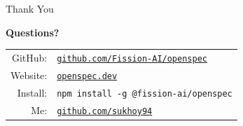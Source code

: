 \documentclass[aspectratio=169,18pt]{beamer}
\begin{document}
\begin{frame}{Thank You}
  \vspace{0.5em}
  \begin{center}
    \Large\textbf{Questions?}\\[1.5em]
    \normalsize
    \begin{tabular}{rl}
      GitHub: & \texttt{\href{https://github.com/Fission-AI/openspec}{\color{openblue}github.com/Fission-AI/openspec}} \\[0.5em]
      Website: & \texttt{\href{https://openspec.dev}{\color{openblue}openspec.dev}} \\[0.5em]
      Install: & \texttt{npm install -g @fission-ai/openspec} \\[0.5em]
      Me: & \texttt{\href{https://github.com/sukhoy94}{\color{openblue}github.com/sukhoy94}} \\
    \end{tabular}
  \end{center}
\end{frame}
\end{document}
